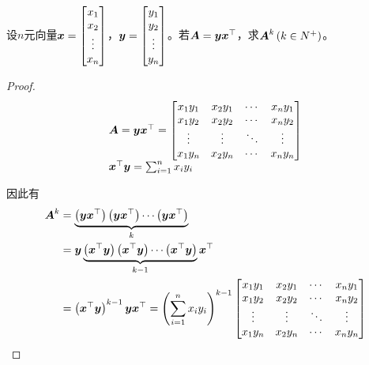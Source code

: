 \begin{problem}
设\(n\)元向量\(\boldsymbol{x}=\begin{bmatrix}x_1\\x_2\\\vdots\\x_n\end{bmatrix}\)，\(\boldsymbol{y}=\begin{bmatrix}y_1\\y_2\\\vdots\\y_n\end{bmatrix}\)。若\(\boldsymbol{A}=\boldsymbol{y}\boldsymbol{x}^\top\)，求\(\boldsymbol{A}^k\left( k \in N^+ \right)\)。
\end{problem}
\begin{proof}
    \begin{equation*}
        \begin{array}{lll}
            \boldsymbol{A}=\boldsymbol{y}\boldsymbol{x}^\top=
            \begin{bmatrix}
                x_1y_1 & x_2y_1 & \cdots & x_ny_1 \\
                x_1y_2 & x_2y_2 & \cdots & x_ny_2 \\
                \vdots & \vdots & \ddots & \vdots \\
                x_1y_n & x_2y_n & \cdots & x_ny_n \\
            \end{bmatrix}  \\
            \boldsymbol{x}^\top\boldsymbol{y}=\sum_{i=1}^nx_iy_i \\
        \end{array}
    \end{equation*}

    因此有
    \begin{align*}
        \boldsymbol{A}^k & =\underbrace{\left( \boldsymbol{y}\boldsymbol{x}^\top \right)\left( \boldsymbol{y}\boldsymbol{x}^\top \right)\cdots\left( \boldsymbol{y}\boldsymbol{x}^\top \right)}_k                    \\
                & =\boldsymbol{y}\underbrace{\left( \boldsymbol{x}^\top\boldsymbol{y} \right)\left( \boldsymbol{x}^\top\boldsymbol{y} \right)\cdots\left( \boldsymbol{x}^\top\boldsymbol{y} \right)}_{k-1}\boldsymbol{x}^\top \\
                & =\left( \boldsymbol{x}^\top\boldsymbol{y} \right)^{k-1}\boldsymbol{y}\boldsymbol{x}^\top=\left( \sum_{i=1}^nx_iy_i \right)^{k-1}
        \begin{bmatrix}
            x_1y_1 & x_2y_1 & \cdots & x_ny_1 \\
            x_1y_2 & x_2y_2 & \cdots & x_ny_2 \\
            \vdots & \vdots & \ddots & \vdots \\
            x_1y_n & x_2y_n & \cdots & x_ny_n \\
        \end{bmatrix}
    \end{align*}
\end{proof}

